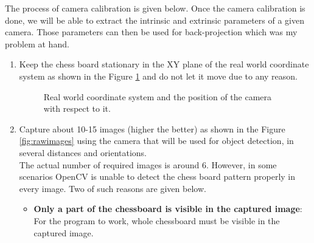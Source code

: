 \documentclass[a4paper,12pt]{report}%
\begin{document}
The process of camera calibration is given below. Once the camera calibration is done, we will be able to extract the intrinsic and extrinsic parameters of a given camera. Those parameters can then be used for back-projection which was my problem at hand.\\

\begin{enumerate}
	\item Keep the chess board stationary in the XY plane of the real world coordinate system as shown in the Figure \ref{fig:clib3dworld} and do not let it move due to any reason.
	
	\begin{figure}[H]
		\centering
		\caption{Real world coordinate system and the position of the camera with respect to it. }
		\label{fig:clib3dworld}
	\end{figure}
	
	\item Capture about 10-15 images (higher the better) as shown in the Figure \ref{fig:rawimages} using the camera that will be used for object detection, in several distances and orientations.\\
	
	The actual number of required images is around 6. However, in some scenarios OpenCV is unable to detect the chess board pattern properly in every image. Two of such reasons are given below.
	
	\begin{itemize}
		\item\textbf{Only a part of the chessboard is visible in the captured image}: For the program to work, whole chessboard must be visible in the captured image.
		

\end{itemize}
\end{enumerate}
\end{document}
